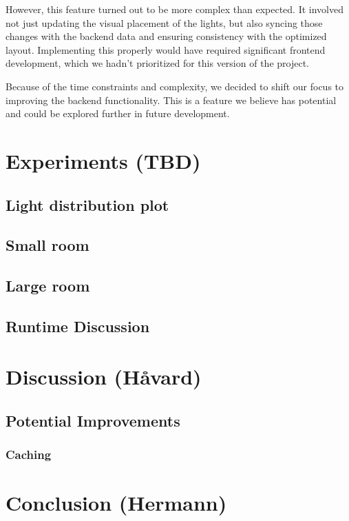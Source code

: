 \documentclass{article}
\begin{document}
However, this feature turned out to be more complex than expected. It involved not just updating the visual placement of the lights, but also syncing those changes with the backend data and ensuring consistency with the optimized layout. Implementing this properly would have required significant frontend development, which we hadn’t prioritized for this version of the project.

Because of the time constraints and complexity, we decided to shift our focus to improving the backend functionality. This is a feature we believe has potential and could be explored further in future development.


\newpage

\section{Experiments (TBD)}
\subsection{Light distribution plot}
\subsection{Small room}
\subsection{Large room}
\subsection{Runtime Discussion}



\newpage

\section{Discussion (Håvard)}

\subsection{Potential Improvements}
\subsubsection{Caching}

\newpage

\section{Conclusion (Hermann)}
\end{document}
